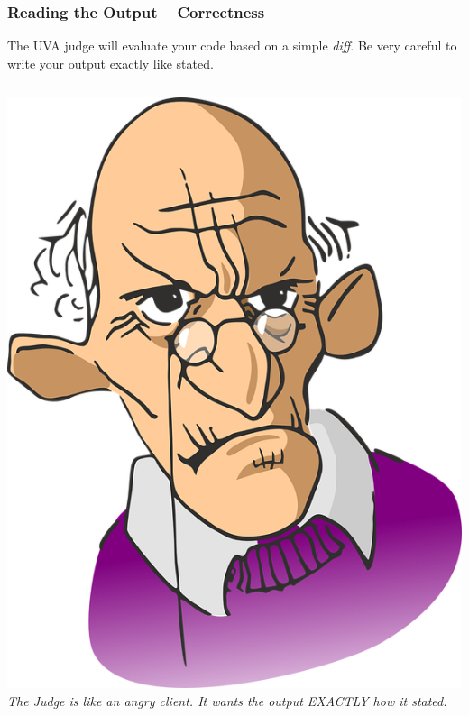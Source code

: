 \documentclass{beamer}
\begin{document}
\begin{frame}
  \frametitle{Reading the Output -- Correctness}

  The UVA judge will evaluate your code based on a simple \emph{diff}. 
  Be \alert{very careful} to write your output exactly like stated.

  \vfill

  \begin{columns}
    \includegraphics[width=1\textwidth]{../img/angryclient}
     \emph{The Judge is like an angry client. It
      wants the output EXACTLY how it stated.}
  \end{columns}

\end{frame}
\end{document}
